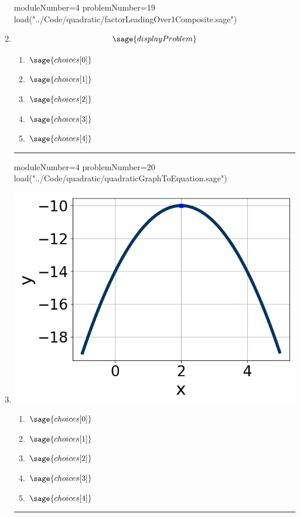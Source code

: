 \documentclass[14pt]{article}
\newcommand{\litem}[1]{\item#1\hspace*{-1cm}\rule{\textwidth}{0.4pt}}
\begin{document}
\begin{enumerate}
\begin{sagesilent}
moduleNumber=4
problemNumber=19
load("../Code/quadratic/factorLeadingOver1Composite.sage")
\end{sagesilent}

\litem{ 

  	\[ \sage{displayProblem} \]

	\begin{enumerate}[label=\Alph*.]
    \item \( \sage{choices[0]} \)
    \item \( \sage{choices[1]} \)
    \item \( \sage{choices[2]} \)
    \item \( \sage{choices[3]} \)
    \item \( \sage{choices[4]} \)
	\end{enumerate}

}

\begin{sagesilent}
moduleNumber=4
problemNumber=20
load("../Code/quadratic/quadraticGraphToEquation.sage")
\end{sagesilent}

\litem{ 

	\begin{center} \includegraphics[scale=0.3]{../Figures/quadraticGraphToEquationA.png} \end{center}

	\begin{enumerate}[label=\Alph*.]
		\item \( \sage{choices[0]} \)
		\item \( \sage{choices[1]} \)
		\item \( \sage{choices[2]} \)
		\item \( \sage{choices[3]} \)
		\item \( \sage{choices[4]} \)
	\end{enumerate}

}

\end{enumerate}
\end{document}
